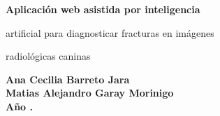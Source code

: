 \documentclass[12pt,a4paper,oneside]{book}
\begin{document}
\vspace{3 cm}
{
\noindent
\begin{center}
\huge \bf Aplicación web asistida por inteligencia 

\vspace{0.5cm}
artificial para diagnosticar fracturas en imágenes


\vspace{0.5 cm}
 radiológicas caninas
\end{center}
}


\vspace{3 cm}

\begin{center}
{\textbf{\Large Ana Cecilia Barreto Jara}\\[5mm]
\textbf{\Large Matias Alejandro Garay Morinigo}\\[5mm]
\vspace{1 cm}
\textbf{Año \the\year.}}
\end{center}








\tableofcontents

\cleardoublepage

\listoffigures
{}
\cleardoublepage

\listoftables
{}




{}
\printglossary[type=\acronymtype] %

\mainmatter
{} %








\backmatter

% 
\end{document}
